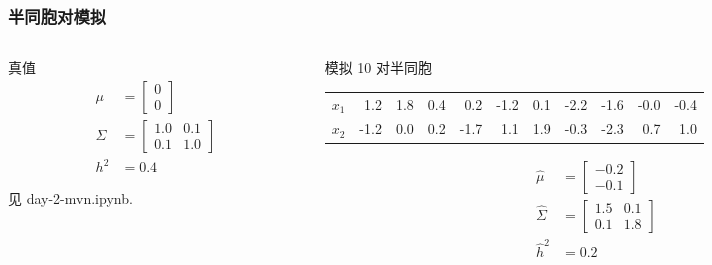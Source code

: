 \documentclass[serif,aspectratio=169]{beamer}
\begin{document}
\begin{frame}
  \frametitle{半同胞对模拟}
  \begin{columns}
    \begin{column}{.3\textwidth}
      \begin{block}{真值}
        \begin{align*}
          \mu &= \left[\begin{array}{c}0\\0\end{array}\right]\\
          \Sigma & = \left[\begin{array}{cr}1.0 & 0.1\\0.1 & 1.0\end{array}\right]\\
          h^2 & = 0.4
        \end{align*}

        见 {\color{cyan}day-2-mvn.ipynb}.
      \end{block}
    \end{column}

    \pause
    \begin{column}{.7\textwidth}
      \begin{block}{模拟 10 对半同胞}
        \begingroup
        \fontsize{7pt}{7pt}\selectfont
        \begin{tabular}{rrrrrrrrrrr}
          $x_1$&1.2&1.8&0.4&0.2&-1.2&0.1&-2.2&-1.6&-0.0&-0.4\\
          $x_2$&-1.2&0.0&0.2&-1.7&1.1&1.9&-0.3&-2.3&0.7&1.0
        \end{tabular}
        \endgroup
        \begin{align*}
          \hat{\mu} &=\left[\begin{array}{r}-0.2\\-0.1\end{array}\right]\\
          \hat{\Sigma} &=\left[\begin{array}{rr}1.5&0.1\\0.1&1.8\end{array}\right]\\
          \hat{h}^2 &=0.2
        \end{align*}
      \end{block}
    \end{column}
  \end{columns}
\end{frame}
\end{document}
